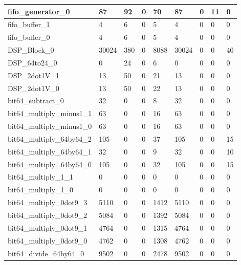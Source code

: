 \begin{landscape}
\begin{longtable}{@{}|l|l|l|l|l|l|l|l|l|@{}}
fifo\_generator\_0 & 87 & 92 & 0 & 70 & 87 & 0 & 11 & 0 \\* \midrule
\rowcolor[HTML]{FFFFFF} 
fifo\_buffer\_1 & 4 & 6 & 0 & 5 & 4 & 0 & 0 & 0 \\* \midrule
\rowcolor[HTML]{FFFFFF} 
fifo\_buffer\_0 & 4 & 6 & 0 & 5 & 4 & 0 & 0 & 0 \\* \midrule
\rowcolor[HTML]{FFFFFF} 
DSP\_Block\_0 & 30024 & 380 & 0 & 8088 & 30024 & 0 & 0 & 40 \\* \midrule
\rowcolor[HTML]{FFFFFF} 
DSP\_64to24\_0 & 0 & 24 & 0 & 6 & 0 & 0 & 0 & 0 \\* \midrule
\rowcolor[HTML]{FFFFFF} 
DSP\_2dot1V\_1 & 13 & 50 & 0 & 21 & 13 & 0 & 0 & 0 \\* \midrule
\rowcolor[HTML]{FFFFFF} 
DSP\_2dot1V\_0 & 13 & 50 & 0 & 22 & 13 & 0 & 0 & 0 \\* \midrule
\rowcolor[HTML]{FFFFFF} 
bit64\_subtract\_0 & 32 & 0 & 0 & 8 & 32 & 0 & 0 & 0 \\* \midrule
\rowcolor[HTML]{FFFFFF} 
bit64\_multiply\_minus1\_1 & 63 & 0 & 0 & 16 & 63 & 0 & 0 & 0 \\* \midrule
\rowcolor[HTML]{FFFFFF} 
bit64\_multiply\_minus1\_0 & 63 & 0 & 0 & 16 & 63 & 0 & 0 & 0 \\* \midrule
\rowcolor[HTML]{FFFFFF} 
bit64\_multiply\_64by64\_2 & 105 & 0 & 0 & 37 & 105 & 0 & 0 & 15 \\* \midrule
\rowcolor[HTML]{FFFFFF} 
bit64\_multiply\_64by64\_1 & 32 & 0 & 0 & 9 & 32 & 0 & 0 & 10 \\* \midrule
\rowcolor[HTML]{FFFFFF} 
bit64\_multiply\_64by64\_0 & 105 & 0 & 0 & 32 & 105 & 0 & 0 & 15 \\* \midrule
\rowcolor[HTML]{FFFFFF} 
bit64\_multiply\_1\_1 & 0 & 0 & 0 & 0 & 0 & 0 & 0 & 0 \\* \midrule
\rowcolor[HTML]{FFFFFF} 
bit64\_multiply\_1\_0 & 0 & 0 & 0 & 0 & 0 & 0 & 0 & 0 \\* \midrule
\rowcolor[HTML]{FFFFFF} 
bit64\_multiply\_0dot9\_3 & 5110 & 0 & 0 & 1412 & 5110 & 0 & 0 & 0 \\* \midrule
\rowcolor[HTML]{FFFFFF} 
bit64\_multiply\_0dot9\_2 & 5084 & 0 & 0 & 1392 & 5084 & 0 & 0 & 0 \\* \midrule
\rowcolor[HTML]{FFFFFF} 
bit64\_multiply\_0dot9\_1 & 4764 & 0 & 0 & 1315 & 4764 & 0 & 0 & 0 \\* \midrule
\rowcolor[HTML]{FFFFFF} 
bit64\_multiply\_0dot9\_0 & 4762 & 0 & 0 & 1308 & 4762 & 0 & 0 & 0 \\* \midrule
\rowcolor[HTML]{FFFFFF} 
bit64\_divide\_64by64\_0 & 9502 & 0 & 0 & 2478 & 9502 & 0 & 0 & 0 \\* \midrule

\end{longtable}
\end{landscape}
